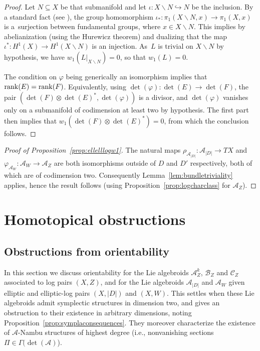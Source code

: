 \documentclass[pdftex]{sigma}
\numberwithin{equation}{section}
\begin{document}
\begin{proof} Let $N \subseteq X$ be that submanifold and let $\iota\colon X\backslash N \hookrightarrow N$ be the inclusion. By a standard fact (see \cite[Theorem~2.3, p.~146]{Godbillon71}), the group homomorphism $\iota_*\colon \pi_1(X\backslash N,x) \to \pi_1(X,x)$ is a~surjection between fundamental groups, where $x \in X \backslash N$. This implies by abelianization (using the Hurewicz theorem) and dualizing that the map $\iota^*\colon H^1(X) \to H^1(X\backslash N)$ is an injection. As~$L$ is trivial on $X \backslash N$ by hypothesis, we have $w_1(L|_{X\backslash N}) = 0$, so that $w_1(L) = 0$.

The condition on $\varphi$ being generically an isomorphism implies that ${\rm rank}(E) = {\rm rank}(F)$. Equivalently, using $\det(\varphi)\colon \det(E) \to \det(F)$, the pair $(\det(F) \otimes \det(E)^*, \det(\varphi))$ is a divisor, and $\det(\varphi)$ vanishes only on a submanifold of codimension at least two by hypothesis. The first part then implies that $w_1(\det(F) \otimes \det(E)^*) = 0$, from which the conclusion follows.
\end{proof}

\begin{proof}[Proof of Proposition~\ref{prop:ellelllogw1}] The natural maps $\rho_{\mathcal{A}_{|D|}}\colon \mathcal{A}_{|D|} \to TX$ and $\varphi_{\mathcal{A}_W}\colon \mathcal{A}_W \to \mathcal{A}_Z$ are both isomorphisms outside of $D$ and $D'$ respectively, both of which are of codimension two. Consequently Lemma~\ref{lem:bundletriviality} applies, hence the result follows (using Proposition~\ref{prop:logcharclass} for $\mathcal{A}_Z$).
\end{proof}

\section{Homotopical obstructions}

\subsection{Obstructions from orientability}\label{sec:existanambu}

In this section we discuss orientability for the Lie algebroids $\mathcal{A}_Z^k$, $\mathcal{B}_Z$ and $\mathcal{C}_Z$ associated to log pairs $(X,Z)$, and for the Lie algebroids $\mathcal{A}_{|D|}$ and $\mathcal{A}_W$ given elliptic and elliptic-log pairs $(X,|D|)$ and $(X,W)$. This settles when these Lie algebroids admit symplectic structures in dimension two, and gives an obstruction to their existence in arbitrary dimensions, noting Proposition~\ref{prop:symplaconsequences}. They moreover characterize the existence of $\mathcal{A}$-Nambu structures of highest degree (i.e., nonvanishing sections $\Pi \in \Gamma(\det(\mathcal{A})$).
\end{document}
